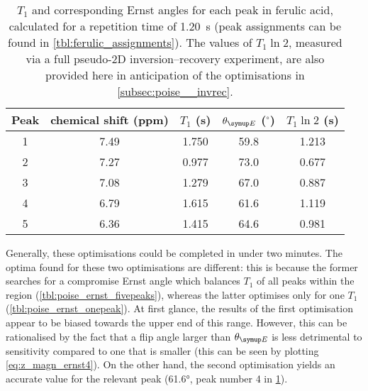 \begin{table}[!ht]
    \centering
    \begin{tabular}{ccccc}
        \toprule
        Peak & \proton{} chemical shift (ppm) & $T_1$ (\unit{\s}) & $\thetaE$ ($^\circ$) & $T_1\ln 2$ (\unit{\s})\\
        \midrule
        1 & 7.49 & 1.750 & 59.8 & 1.213 \\
        2 & 7.27 & 0.977 & 73.0 & 0.677 \\
        3 & 7.08 & 1.279 & 67.0 & 0.887 \\
        4 & 6.79 & 1.615 & 61.6 & 1.119 \\
        5 & 6.36 & 1.415 & 64.6 & 0.981 \\
        \bottomrule
    \end{tabular}
    \caption[$T_1$ values for ferulic acid]{
        $T_1$ and corresponding Ernst angles for each peak in ferulic acid, calculated for a repetition time of \qty{1.20}{\s} (peak assignments can be found in \cref{tbl:ferulic_assignments}).
        The values of $T_1 \ln 2$, measured via a full pseudo-2D inversion--recovery experiment, are also provided here in anticipation of the optimisations in \cref{subsec:poise__invrec}.
    }
    \label{tbl:ernst_invrec}
\end{table}

Generally, these optimisations could be completed in under two minutes.
The optima found for these two optimisations are different: this is because the former searches for a compromise Ernst angle which balances $T_1$ of all peaks within the region (\cref{tbl:poise_ernst_fivepeaks}), whereas the latter optimises only for one $T_1$ (\cref{tbl:poise_ernst_onepeak}).
At first glance, the results of the first optimisation appear to be biased towards the upper end of this range.
However, this can be rationalised by the fact that a flip angle larger than $\thetaE$ is less detrimental to sensitivity compared to one that is smaller (this can be seen by plotting \cref{eq:z_magn_ernst4}).
On the other hand, the second optimisation yields an accurate value for the relevant peak (\ang{61.6}, peak number 4 in \cref{tbl:ernst_invrec}).

